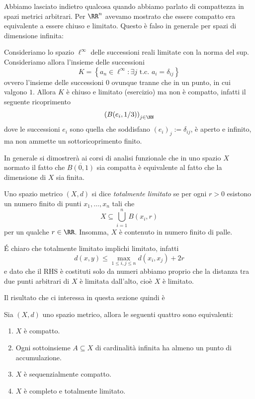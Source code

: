 \documentclass[11pt]{scrartcl}
\begin{document}
	Abbiamo lasciato indietro qualcosa quando abbiamo parlato di compattezza in spazi metrici arbitrari. Per $\RR^n$ avevamo mostrato che essere compatto era equivalente a essere chiuso e limitato. Questo è falso in generale per spazi di dimensione infinita:
	\begin{example}
		Consideriamo lo spazio $\ell^\infty$ delle successioni reali limitate con la norma del sup. Consideriamo allora l'insieme delle successioni
		$$K=\left\{a_n\in \ell^\infty: \exists j\text{ t.c. } a_i=\delta_{ij}\right\}$$
		ovvero l'insieme delle successioni $0$ ovunque tranne che in un punto, in cui valgono $1$. Allora $K$ è chiuso e limitato (esercizio) ma non è compatto, infatti il seguente ricoprimento
		$$\left(B(e_i,1/3)\right)_{j\in\NN}$$
		dove le successioni $e_i$ sono quella che soddisfano $(e_i)_j:=\delta_{ij}$, è aperto e infinito, ma non ammette un sottoricoprimento finito.
	\end{example}
	In generale si dimostrerà ai corsi di analisi funzionale che in uno spazio $X$ normato il fatto che $\overline{B(0,1)}$ sia compatta è equivalente al fatto che la dimensione di $X$ sia finita. 
	\begin{definition}
		Uno spazio metrico $(X,d)$ si dice \textit{totalmente limitato} se per ogni $r>0$ esistono un numero finito di punti $x_1,\dots,x_n$ tali che
		$$X\subseteq \bigcup_{i=1}^n B(x_i,r)$$
		per un qualche $r\in\RR$. Insomma, $X$ è contenuto in numero finito di palle.
	\end{definition}
	\begin{remark}
		\'E chiaro che totalmente limitato implichi limitato, infatti 
		$$d(x,y)\le \max_{1\le i,j\le n}d(x_i,x_j)+2r$$
		e dato che il RHS è costituti solo da numeri abbiamo proprio che la distanza tra due punti arbitrari di $X$ è limitata dall'alto, cioè $X$ è limitato.
	\end{remark}
	Il risultato che ci interessa in questa sezione quindi è
	\begin{theorem}
		Sia $(X,d)$ uno spazio metrico, allora le seguenti quattro sono equivalenti:
		\begin{enumerate}
			\item $X$ è compatto.
			\item Ogni sottoinsieme $A\subseteq X$ di cardinalità infinita ha almeno un punto di accumulazione.
			\item $X$ è sequenzialmente compatto.
			\item $X$ è completo e totalmente limitato.
		\end{enumerate}
	\end{theorem}
\end{document}
